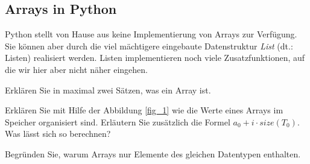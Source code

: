 \documentclass[loesung]{schulein}
\begin{document}
\subsection*{Arrays in Python}
Python stellt von Hause aus keine Implementierung von Arrays zur Verfügung. Sie können aber durch die viel mächtigere eingebaute Datenstruktur \textit{List} (dt.: Listen) realisiert werden. Listen implementieren noch viele Zusatzfunktionen, auf die wir hier aber nicht näher eingehen.

\begin{aufgaben}
\item \leicht Erklären Sie in maximal zwei Sätzen, was ein Array ist.
\item \mittel Erklären Sie mit Hilfe der Abbildung \ref{fig_1} wie die Werte eines Arrays im Speicher organisiert sind. Erläutern Sie zusätzlich die Formel $a_0+i\cdot size(T_0)$. Was lässt sich so berechnen? 
\item \schwer Begründen Sie, warum Arrays nur Elemente des gleichen Datentypen enthalten. %
\end{aufgaben}
\end{document}
